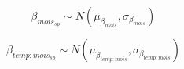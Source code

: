 \documentclass{article}
\begin{document}
\begin{equation}
\beta_{mois_{sp}} \sim N(\mu_{\beta_{mois}}, \sigma_{\beta_{mois}})
\end{equation}

\begin{equation}
\beta_{temp:mois_{sp}} \sim N(\mu_{\beta_{temp:mois}}, \sigma_{\beta_{temp:mois}})
\end{equation}


% 
% 
% 
% 
% 
% 
% 
% 
% 



\end{document}
